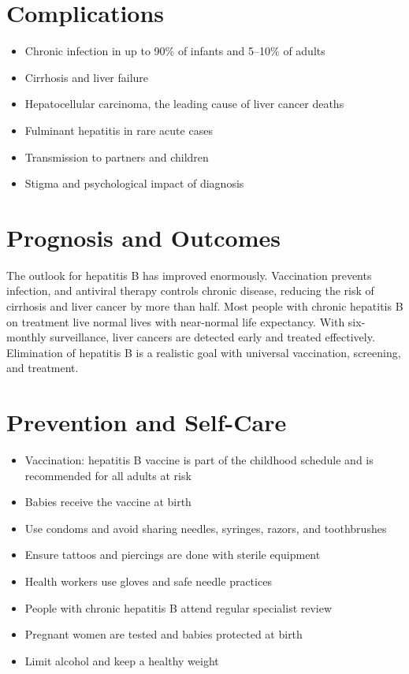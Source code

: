 \section*{Complications}
\begin{itemize}
    \item Chronic infection in up to 90\% of infants and 5--10\% of adults
    \item Cirrhosis and liver failure
    \item Hepatocellular carcinoma, the leading cause of liver cancer deaths
    \item Fulminant hepatitis in rare acute cases
    \item Transmission to partners and children
    \item Stigma and psychological impact of diagnosis
\end{itemize}

\section*{Prognosis and Outcomes}
The outlook for hepatitis B has improved enormously. Vaccination prevents infection, and antiviral therapy controls chronic disease, reducing the risk of cirrhosis and liver cancer by more than half. Most people with chronic hepatitis B on treatment live normal lives with near-normal life expectancy. With six-monthly surveillance, liver cancers are detected early and treated effectively. Elimination of hepatitis B is a realistic goal with universal vaccination, screening, and treatment.

\section*{Prevention and Self-Care}
\begin{itemize}
    \item Vaccination: hepatitis B vaccine is part of the childhood schedule and is recommended for all adults at risk
    \item Babies receive the vaccine at birth
    \item Use condoms and avoid sharing needles, syringes, razors, and toothbrushes
    \item Ensure tattoos and piercings are done with sterile equipment
    \item Health workers use gloves and safe needle practices
    \item People with chronic hepatitis B attend regular specialist review
    \item Pregnant women are tested and babies protected at birth
    \item Limit alcohol and keep a healthy weight
\end{itemize}

